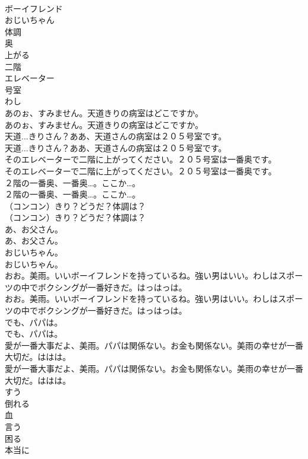 \documentclass[8pt]{extreport}
\begin{document}
\begin{CJK}{UTF8}{min}
\\	ボーイフレンド
\\	おじいちゃん
\\	体調
\\	奥
\\	上がる
\\	二階
\\	エレベーター
\\	号室
\\	わし
\\	あのぉ、すみません。天道きりの病室はどこですか。	
\\	あのぉ、すみません。天道きりの病室はどこですか。 
\\	天道...きりさん？ああ、天道さんの病室は２０５号室です。	
\\	天道...きりさん？ああ、天道さんの病室は２０５号室です。 
\\	そのエレベーターで二階に上がってください。２０５号室は一番奥です。	
\\	そのエレベーターで二階に上がってください。２０５号室は一番奥です。 
\\	２階の一番奥、一番奥…。ここか…。	
\\	２階の一番奥、一番奥…。ここか…。 
\\	（コンコン）きり？どうだ？体調は？	
\\	（コンコン）きり？どうだ？体調は？ 
\\	あ、お父さん。	
\\	あ、お父さん。 
\\	おじいちゃん。	
\\	おじいちゃん。 
\\	おお。美雨。いいボーイフレンドを持っているね。強い男はいい。わしはスポーツの中でボクシングが一番好きだ。はっはっは。	
\\	おお。美雨。いいボーイフレンドを持っているね。強い男はいい。わしはスポーツの中でボクシングが一番好きだ。はっはっは。 
\\	でも、パパは。	
\\	でも、パパは。 
\\	愛が一番大事だよ、美雨。パパは関係ない。お金も関係ない。美雨の幸せが一番大切だ。ははは。	
\\	愛が一番大事だよ、美雨。パパは関係ない。お金も関係ない。美雨の幸せが一番大切だ。ははは。 
\\	すう
\\	倒れる
\\	血
\\	言う
\\	困る
\\	本当に

\end{CJK}
\end{document}
